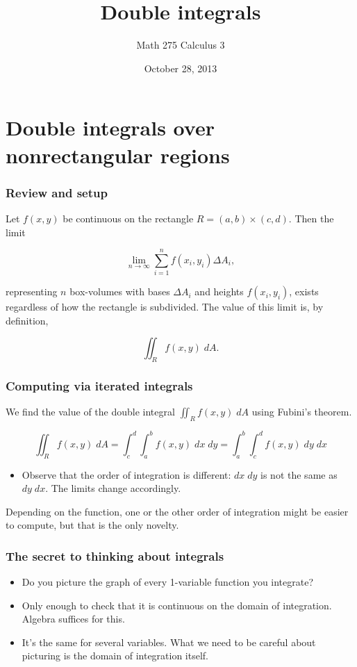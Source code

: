 \documentclass[11pt,ignorenonframetext,aspectratio=169,xcolor={svgnames}]{beamer}
\title{Double integrals}
\author{Math 275 Calculus 3}
\date{October 28, 2013}
\begin{document}
\frame{\titlepage}

\section{Double integrals over nonrectangular regions}

\begin{frame}\frametitle{Review and setup}

Let $f(x,y)$ be continuous on the rectangle $R = (a,b) \times (c,d)$.
Then the limit

\[ \lim_{n \to \infty} \sum_{i=1}^n f(x_i, y_i) \Delta A_i, \]

representing $n$ box-volumes with bases $\Delta A_i$ and heights
$f(x_i,y_i)$, exists regardless of how the rectangle is subdivided. The
value of this limit is, by definition,

\[ \iint_R f(x,y) \; dA. \]

\end{frame}

\begin{frame}\frametitle{Computing via iterated integrals}

We find the value of the double integral $\iint_R f(x,y) \; dA$ using
Fubini's theorem.

\[ \iint_R f(x,y) \; dA = \int_c^d \int_a^b f(x,y) \; dx \; dy = \int_a^b \int_c^d f(x,y) \; dy \; dx \]

\begin{itemize}

\item
  Observe that the order of integration is different: $dx \; dy$ is not
  the same as $dy \; dx$. The limits change accordingly.
\end{itemize}

Depending on the function, one or the other order of integration might
be easier to compute, but that is the only novelty.

\end{frame}

\begin{frame}\frametitle{The secret to thinking about integrals}

\begin{itemize}

\item
  Do you picture the graph of every 1-variable function you integrate?
\item
  Only enough to check that it is continuous on the domain of
  integration. Algebra suffices for this.
\item
  It's the same for several variables. What we need to be careful about
  picturing is the domain of integration itself.
\end{itemize}

\end{frame}
\end{document}
